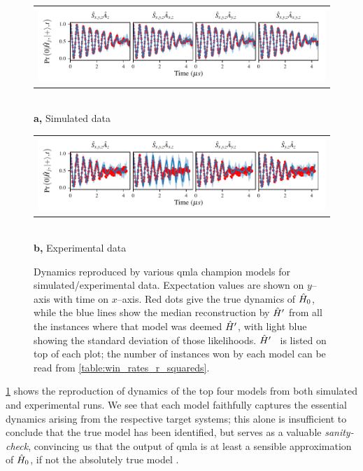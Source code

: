 \begin{figure}
    \centering
    \begin{tabular}{@{}c@{}}
        \includegraphics{experimental_study/figures/reproduced_dyamics_sim.pdf}
    \end{tabular}
    \\ \small \textbf{a,} Simulated data
    \centering

    \begin{tabular}{@{}c@{}}
        \includegraphics{experimental_study/figures/reproduced_dyamics_exp.pdf}
    \end{tabular}
    \\ \small \textbf{b,} Experimental data

    \caption[Dynamics reproduced by \gls{qmla} \glspl{champion model} for simulated/experimental data]{
        Dynamics reproduced by various \gls{qmla} \glspl{champion model} for simulated/experimental data. 
        Expectation values are shown on $y$--axis with time on $x$--axis. 
        Red dots give the true dynamics of $\hat{H}_0$, while the blue lines show the median reconstruction by $\hat{H}^{\prime}$
        from all the \glspl{instance} where that model was deemed $\hat{H}^{\prime}$, with light blue showing the standard deviation of those \glspl{likelihood}.   
        $\hat{H}^{\prime}$ \ is listed on top of each plot; the number of \glspl{instance} won by each model can be read from \cref{table:win_rates_r_squareds}.
        \figtableref 
        }
    \label{fig:nv_model_dynamics}
\end{figure}

\cref{fig:nv_model_dynamics} shows the reproduction of dynamics of the top four models
    from both simulated and experimental \glspl{run}. 
We see that each model faithfully captures the essential dynamics arising from the respective target systems;
    this alone is insufficient to conclude that the \gls{true model} has been identified, 
    but serves as a valuable \emph{sanity-check}, convincing us that the output of \gls{qmla} is at least a sensible 
    approximation of $\hat{H}_0$, if not the absolutely  \gls{true model} .
\par 


